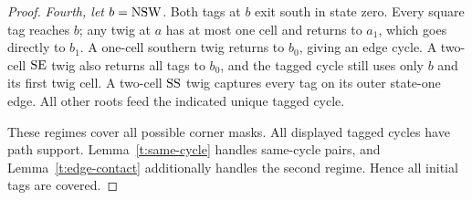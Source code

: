 \begin{proof}
\emph{Fourth, let \(b=\mathrm{N}\mathrm{S}\mathrm{W}\).}
Both tags at \(b\) exit south in state zero. Every square tag reaches
\(b\); any twig at \(a\) has at most one cell and returns to \(a_1\),
which goes directly to \(b_1\). A one-cell southern twig returns to
\(b_0\), giving an edge cycle. A two-cell \(\mathrm{S}\mathrm{E}\) twig also
returns all tags to \(b_0\), and the tagged cycle still uses only \(b\)
and its first twig cell. A two-cell \(\mathrm{S}\mathrm{S}\) twig captures every
tag on its outer state-one edge. All other roots feed the indicated unique
tagged cycle.

These regimes cover all possible corner masks. All displayed tagged cycles
have path support. Lemma~\ref{t:same-cycle} handles same-cycle pairs, and
Lemma~\ref{t:edge-contact} additionally handles the second regime.
Hence all initial tags are covered.
\end{proof}

